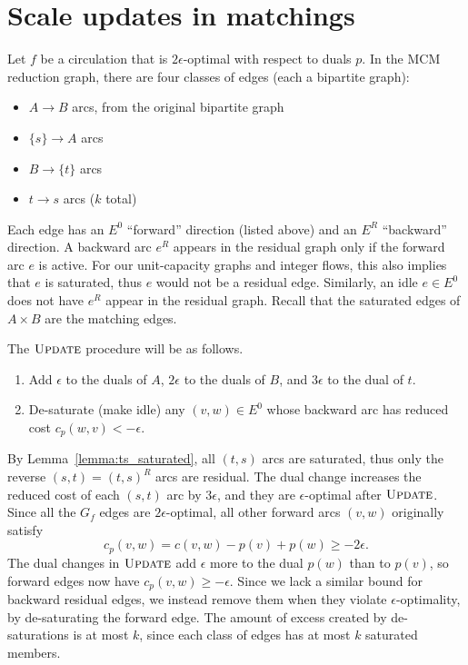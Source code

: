 \documentclass[11pt]{article}
\def\Update{\textsc{Update}}
\theoremstyle{plain}
\begin{document}
\section{Scale updates in matchings}
\label{section:scale_update}

Let $f$ be a circulation that is $2\epsilon$-optimal with respect to duals $p$.
In the MCM reduction graph, there are four classes of edges (each a bipartite graph):
\begin{itemize}
\item $A \to B$ arcs, from the original bipartite graph
\item $\{s\} \to A$ arcs
\item $B \to \{t\}$ arcs
\item $t \to s$ arcs ($k$ total)
\end{itemize}
Each edge has an $E^0$ ``forward'' direction (listed above)
and an $E^R$ ``backward'' direction.
A backward arc $e^R$ appears in the residual graph only if the forward arc $e$ is active.
For our unit-capacity graphs and integer flows, this also implies that $e$ is saturated,
thus $e$ would not be a residual edge. 
Similarly, an idle $e \in E^0$ does not have $e^R$ appear in the residual graph.
Recall that the saturated edges of $A \times B$ are the matching edges.

The $\Update$ procedure will be as follows.
\begin{enumerate}
\item Add $\epsilon$ to the duals of $A$, $2\epsilon$ to the duals of $B$, 
	and $3\epsilon$ to the dual of $t$.
\item De-saturate (make idle) any $(v, w) \in E^0$ whose 
	backward arc has reduced cost $c_p(w, v) < -\epsilon$.
\end{enumerate}

By Lemma~\ref{lemma:ts_saturated}, all $(t, s)$ arcs are saturated,
thus only the reverse $(s, t) = (t, s)^R$  arcs are residual.
The dual change increases the reduced cost of each $(s, t)$ arc by $3\epsilon$,
and they are $\epsilon$-optimal after $\Update$.
Since all the $G_f$ edges are $2\epsilon$-optimal, 
all other forward arcs $(v, w)$ originally satisfy
\begin{equation*}
	c_p(v, w) = c(v, w) - p(v) + p(w) \geq -2\epsilon.
\end{equation*}
The dual changes in $\Update$ add $\epsilon$ more to the dual $p(w)$ than to $p(v)$, 
so forward edges now have $c_p(v, w) \geq -\epsilon$.
Since we lack a similar bound for backward residual edges,
we instead remove them when they violate $\epsilon$-optimality, 
by de-saturating the forward edge.
The amount of excess created by de-saturations is at most $k$,
since each class of edges has at most $k$ saturated members.
\end{document}

